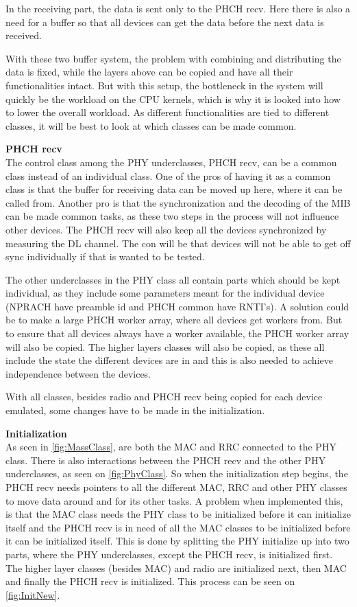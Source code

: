In the receiving part, the data is sent only to the PHCH recv. Here there is also a need for a buffer so that all devices can get the data before the next data is received. 

With these two buffer system, the problem with combining and distributing the data is fixed, while the layers above can be copied and have all their functionalities intact. But with this setup, the bottleneck in the system will quickly be the workload on the CPU kernels, which is why it is looked into how to lower the overall workload. As different functionalities are tied to different classes, it will be best to look at which classes can be made common.

\textbf{PHCH recv}\\

The control class among the PHY underclasses, PHCH recv, can be a common class instead of an individual class. One of the pros of having it as a common class is that the buffer for receiving data can be moved up here, where it can be called from. Another pro is that the synchronization and the decoding of the MIB can be made common tasks, as these two steps in the process will not influence other devices. The PHCH recv will also keep all the devices synchronized by measuring the DL channel. The con will be that devices will not be able to get off sync individually if that is wanted to be tested.

The other underclasses in the PHY class all contain parts which should be kept individual, as they include some parameters meant for the individual device (NPRACH have preamble id and PHCH common have RNTI's). A solution could be to make a large PHCH worker array, where all devices get workers from. But to ensure that all devices always have a worker available, the PHCH worker array will also be copied. The higher layers classes will also be copied, as these all include the state the different devices are in and this is also needed to achieve independence between the devices.

With all classes, besides radio and PHCH recv being copied for each device emulated, some changes have to be made in the initialization.

\textbf{Initialization}\\

As seen in \autoref{fig:MassClass}, are both the MAC and RRC connected to the PHY class. There is also interactions between the PHCH recv and the other PHY underclasses, as seen on \autoref{fig:PhyClass}. So when the initialization step begins, the PHCH recv needs pointers to all the different MAC, RRC and other PHY classes to move data around and for its other tasks. A problem when implemented this, is that the MAC class needs the PHY class to be initialized before it can initialize itself and the PHCH recv is in need of all the MAC classes to be initialized before it can be initialized itself. This is done by splitting the PHY initialize up into two parts, where the PHY underclasses, except the PHCH recv, is initialized first. The higher layer classes (besides MAC) and radio are initialized next, then MAC and finally the PHCH recv is initialized. This process can be seen on \autoref{fig:InitNew}.

